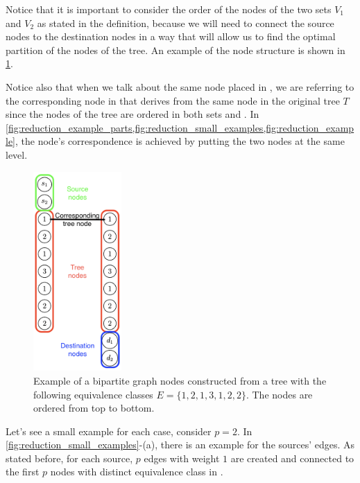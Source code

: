 Notice that it is important to consider the order of the nodes of the two sets $V_1$ and $V_2$ as stated in the definition, because we will need to connect the source nodes to the destination nodes in a way that will allow us to find the optimal partition of the nodes of the tree. An example of the node structure is shown in \cref{fig:reduction_example_parts}.

Notice also that when we talk about the same  node placed in , we are referring to the corresponding node in  that derives from the same node in the original tree $T$ since the nodes of the tree are ordered in both sets  and . In  \cref{fig:reduction_example_parts,fig:reduction_small_examples,fig:reduction_example}, the node's correspondence is achieved by putting the two nodes at the same level.

\begin{figure}[H]
    \centering
    \includegraphics[width=0.3\textwidth]{Immagini/bipartite_keys_part.png}
    \caption[Bipartite nodes structure]{Example of a bipartite graph nodes constructed from a tree with the following equivalence classes $E = \{1,2,1,3,1,2,2\}$. The nodes are ordered from top to bottom. }
    \label{fig:reduction_example_parts}
\end{figure}

Let's see a small example for each case, consider $p=2$. In \cref{fig:reduction_small_examples}-(a), there is an example for the sources' edges. As stated before, for each source, $p$ edges with weight $1$ are created and connected to the first $p$ nodes with distinct equivalence class in .

